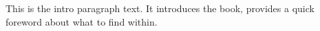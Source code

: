 \cleardoublepage

\chapter*{}

This is the intro paragraph text. It introduces the book, provides a quick foreword about what to find within.

